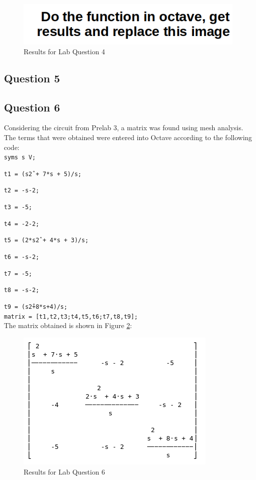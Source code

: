 \documentclass[12pt, a4paper]{article}
\begin{document}
	\begin{figure}[H]
		\centering
		\includegraphics[width=\textwidth]{question_4}
		\caption{Results for Lab Question 4}
		\label{fig:question_4}
	\end{figure}


	\subsection{Question 5}

	\subsection{Question 6}
	Considering the circuit from Prelab 3, a matrix was found using mesh analysis. The terms that were obtained were entered into Octave according to the following code:\\

	\texttt{syms s V;} \par
	\texttt{t1 = (s\^2 + 7*s + 5)/s;}\par
	\texttt{t2 = -s-2;}\par
	\texttt{t3 = -5;}\par
	\texttt{t4 = -2-2;}\par
	\texttt{t5 = (2*s\^2 + 4*s + 3)/s;}\par
	\texttt{t6 = -s-2;}\par
	\texttt{t7 = -5;}\par
	\texttt{t8 = -s-2;}\par
	\texttt{t9 = (s\^2+8*s+4)/s;}\\

	\texttt{matrix = [t1,t2,t3;t4,t5,t6;t7,t8,t9];}\\

	The matrix obtained is shown in Figure \ref{fig:question_6}:\\
	
	\begin{figure}[H]
		\centering
		\includegraphics[width=\textwidth]{question_6}
		\caption{Results for Lab Question 6}
		\label{fig:question_6}
	\end{figure}
\end{document}

